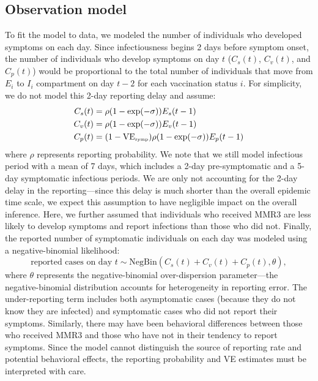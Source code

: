 \documentclass[12pt]{article}
\begin{document}
\subsection{Observation model}

To fit the model to data, we modeled the number of individuals who developed symptoms on each day.
Since infectiousness begins 2 days before symptom onset, the number of individuals who develop symptoms on day $t$ ($C_s(t)$, $C_v(t)$, and $C_p(t)$) would be proportional to the total number of individuals that move from $E_i$ to $I_i$ compartment on day $t-2$ for each vaccination status $i$.
For simplicity, we do not model this 2-day reporting delay and assume:
\begin{align}
C_s(t) &= \rho (1-\exp(- \sigma)) E_s(t-1)\\
C_v(t) &= \rho (1-\exp(- \sigma)) E_v(t-1)\\
C_p(t) &= (1- \mathrm{VE}_{\textrm{\tiny{symp}}}) \rho (1-\exp(- \sigma)) E_p(t-1)
\end{align}
where $\rho$ represents reporting probability.
We note that we still model infectious period with a mean of 7 days, which includes a 2-day pre-symptomatic and a 5-day symptomatic infectious periods.
We are only not accounting for the 2-day delay in the reporting---since this delay is much shorter than the overall epidemic time scale, we expect this assumption to have negligible impact on the overall inference.
Here, we further assumed that individuals who received MMR3 are less likely to develop symptoms and report infections than those who did not.
Finally, the reported number of symptomatic individuals on each day was modeled using a negative-binomial likelihood:
\begin{equation}
\textrm{reported cases on day } t \sim \mathrm{NegBin}(C_s(t) + C_v(t) + C_p(t), \theta),
\end{equation}
where $\theta$ represents the negative-binomial over-dispersion parameter---the negative-binomial distribution accounts for heterogeneity in reporting error.
The under-reporting term includes both asymptomatic cases (because they do not know they are infected) and symptomatic cases who did not report their symptoms.
Similarly, there may have been behavioral differences between those who received MMR3 and those who have not in their tendency to report symptoms.
Since the model cannot distinguish the source of reporting rate and potential behavioral effects, the reporting probability and VE estimates must be interpreted with care.
\end{document}
